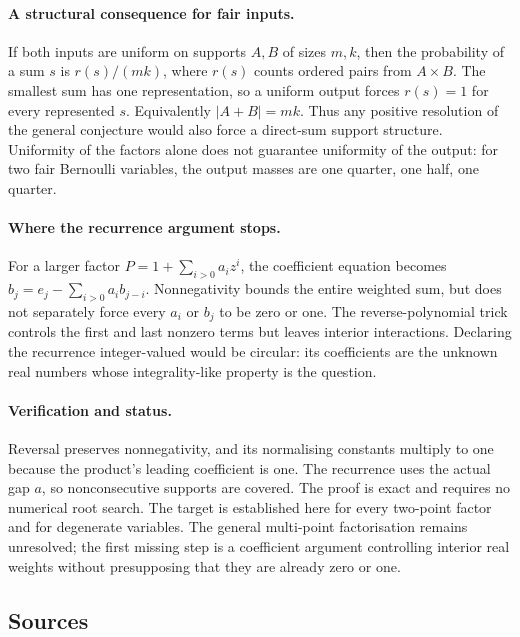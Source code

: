 \documentclass[11pt,a4paper]{article}
\begin{document}
\paragraph{A structural consequence for fair inputs.}
If both inputs are uniform on supports $A,B$ of sizes $m,k$, then the probability of a sum $s$ is $r(s)/(mk)$, where $r(s)$ counts ordered pairs from $A\times B$. The smallest sum has one representation, so a uniform output forces $r(s)=1$ for every represented $s$. Equivalently $|A+B|=mk$. Thus any positive resolution of the general conjecture would also force a direct-sum support structure. Uniformity of the factors alone does not guarantee uniformity of the output: for two fair Bernoulli variables, the output masses are one quarter, one half, one quarter.

\paragraph{Where the recurrence argument stops.}
For a larger factor $P=1+\sum_{i>0}a_iz^i$, the coefficient equation becomes $b_j=e_j-\sum_{i>0}a_ib_{j-i}$. Nonnegativity bounds the entire weighted sum, but does not separately force every $a_i$ or $b_j$ to be zero or one. The reverse-polynomial trick controls the first and last nonzero terms but leaves interior interactions. Declaring the recurrence integer-valued would be circular: its coefficients are the unknown real numbers whose integrality-like property is the question.

\paragraph{Verification and status.}
Reversal preserves nonnegativity, and its normalising constants multiply to one because the product's leading coefficient is one. The recurrence uses the actual gap $a$, so nonconsecutive supports are covered. The proof is exact and requires no numerical root search. The target is established here for every two-point factor and for degenerate variables. The general multi-point factorisation remains unresolved; the first missing step is a coefficient argument controlling interior real weights without presupposing that they are already zero or one.

\subsection{Sources}
\end{document}
